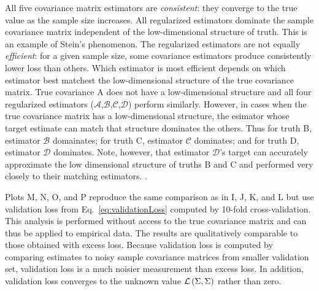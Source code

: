 All five covariance matrix estimators are \emph{consistent}: they converge to the true value as the sample size increases.   All regularized estimators dominate the sample covariance matrix independent of the low-dimensional structure of truth.  This is an example of Stein's phenomenon.  The regularized estimators are not equally \emph{efficient}: for a given sample size, some covariance estimators produce consistently lower loss than others.  Which estimator is most efficient depends on which estimator best matchest the low-dimensional structure of the true covariance matrix.  True covariance A does not have a low-dimensional structure and all four regularized estimators ($\mathcal A$,$\mathcal B$,$\mathcal C$,$\mathcal D$) perform similarly.  However, in cases when the true covariance matrix has a low-dimensional structure, the esimator whose target estimate can match that structure dominates the others.  Thus for truth B, estimator $\mathcal B$ domainates; for truth C, estimator $\mathcal C$ dominates; and for truth D,  estimator $\mathcal D$ dominates.  Note, however, that estimator $\mathcal D$'s target can accurately approximate the low dimensional structure of truths B and C and performed very closely to their matching estimators. .

Plots M, N, O, and P reproduce the same comparison as in I, J, K, and L but use validation loss from Eq.~\ref{eq:validationLoss} computed by 10-fold cross-validation.  This analysis is performed without access to the true covariance matrix and can thus be applied to empirical data.  The results are qualitatively comparable to those obtained with excess loss.  Because validation loss is computed by comparing estimates to noisy sample covariance matrices from smaller validation set, validation loss is a much noisier measurement than excess loss. In addition, validation loss converges to the unknown value $\mathcal L\left(\Sigma,\Sigma\right)$ rather than zero.
